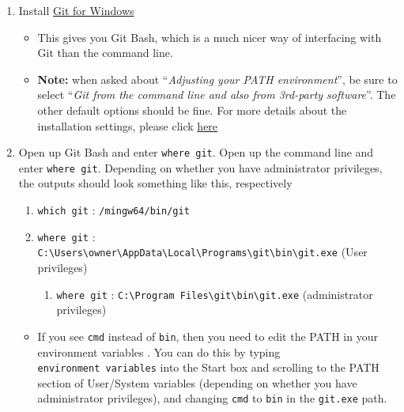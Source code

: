 \documentclass[]{book}
\providecommand{\tightlist}{%
  \setlength{\itemsep}{0pt}\setlength{\parskip}{0pt}}
\begin{document}
\begin{enumerate}
\def\labelenumi{\arabic{enumi}.}
\tightlist
\item
  Install \href{https://Gitforwindows.org/}{Git for Windows}

  \begin{itemize}
  \tightlist
  \item
    This gives you Git Bash, which is a much nicer way of interfacing with Git than the command line.
  \item
    \textbf{Note:} when asked about ``\emph{Adjusting your PATH environment}'', be sure to select ``\emph{Git from the command line and also from 3rd-party software}''. The other default options should be fine. For more details about the installation settings, please click \href{https://Github.com/jennybc/happy-Git-with-r/issues/105}{here}
  \end{itemize}
\item
  Open up Git Bash and enter \texttt{where\ git}. Open up the command line and enter \texttt{where\ git}. Depending on whether you have administrator privileges, the outputs should look something like this, respectively

  \begin{enumerate}
  \def\labelenumii{\arabic{enumii}.}
  \tightlist
  \item
    \texttt{which\ git} : \texttt{/mingw64/bin/git}
  \item
    \texttt{where\ git} : \texttt{C:\textbackslash{}Users\textbackslash{}owner\textbackslash{}AppData\textbackslash{}Local\textbackslash{}Programs\textbackslash{}git\textbackslash{}bin\textbackslash{}git.exe} (User privileges)

    \begin{enumerate}
    \def\labelenumiii{\arabic{enumiii}.}
    \tightlist
    \item
      \texttt{where\ git} : \texttt{C:\textbackslash{}Program\ Files\textbackslash{}git\textbackslash{}bin\textbackslash{}git.exe} (administrator privileges)
    \end{enumerate}
  \end{enumerate}

  \begin{itemize}
  \tightlist
  \item
    If you see \texttt{cmd} instead of \texttt{bin}, then you need to edit the PATH in your environment variables . You can do this by typing \texttt{environment\ variables} into the Start box and scrolling to the PATH section of User/System variables (depending on whether you have administrator privileges), and changing \texttt{cmd} to \texttt{bin} in the \texttt{git.exe} path.
  \end{itemize}
\end{enumerate}
\end{document}
